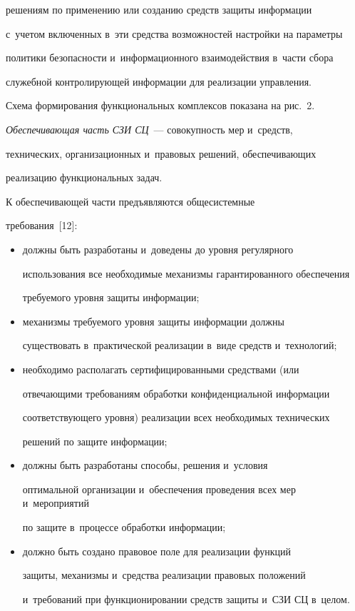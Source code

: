 решениям по применению или созданию средств защиты информации 

с~учетом включенных в~эти средства возможностей настройки на параметры 

политики безопасности и~информационного взаимодействия в~части сбора 

служебной контролирующей информации для реализации управления. 

    

    Схема формирования функциональных комплексов показана на рис.~2.

     



     

    \textit{Обеспечивающая часть СЗИ СЦ}~--- совокупность мер и~средств, 

технических, организационных и~правовых решений, обеспечивающих 

реализацию функциональных задач.

    

    К обеспечивающей части предъявляются обще\-сис\-тем\-ные 

требования~[12]:

    \begin{itemize}

    \item должны быть разработаны и~доведены до уровня регулярного 

использования все необходимые механизмы гарантированного обеспечения 

требуемого уровня защиты информации; 

    \item механизмы требуемого уровня защиты информации должны 

существовать в~практической реализации в~виде средств и~технологий; 

    \item необходимо располагать сертифицированными средствами (или 

отвечающими требованиям обработки конфиденциальной информации 

соответствующего уровня) реализации всех необходимых технических 

решений по защите информации; 

    \item должны быть разработаны способы, решения и~условия 

оптимальной организации и~обеспечения проведения всех мер и~мероприятий 

по защите в~процессе обработки информации;

    \item должно быть создано правовое поле для реализации функций 

защиты, механизмы и~средства реализации правовых положений 

и~требований при функционировании средств защиты и~СЗИ СЦ в~целом.

    \end{itemize}

